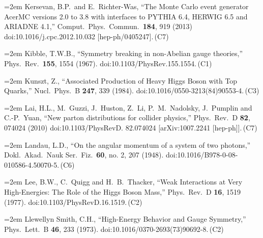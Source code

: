 \documentclass[letter,12pt]{article}
\def\xbibitem#1#2#3{\noindent\hangindent=2em #2\,(#3)}
\begin{document}
\xbibitem{Kersevan:2004yg}{Kersevan, B.P.\ and E.~Richter-Was,
  ``The Monte Carlo event generator AcerMC versions 2.0 to 3.8 with interfaces to PYTHIA 6.4, HERWIG 6.5 and ARIADNE 4.1,''
  Comput.\ Phys.\ Commun.\  {\bf 184}, 919 (2013)
  doi:10.1016/j.cpc.2012.10.032
  [hep-ph/0405247].}{C7}
  
\xbibitem{Kibble:1967sv} {Kibble, T.W.B.,
  ``Symmetry breaking in non-Abelian gauge theories,''
  Phys.\ Rev.\  {\bf 155}, 1554 (1967).
  doi:10.1103/PhysRev.155.1554.}{C1}

\xbibitem{Kunszt:1984ri}{Kunszt, Z.,
  ``Associated Production of Heavy Higgs Boson with Top Quarks,''
  Nucl.\ Phys.\ B {\bf 247}, 339 (1984).
  doi:10.1016/0550-3213(84)90553-4.}{C3}
  
\xbibitem{Lai:2010vv} {Lai, H.L., M.~Guzzi, J.~Huston, Z.~Li, P.~M.~Nadolsky, J.~Pumplin and C.-P.~Yuan,
  ``New parton distributions for collider physics,''
  Phys.\ Rev.\ D {\bf 82}, 074024 (2010)
  doi:10.1103/PhysRevD. 82.074024
  [arXiv:1007.2241 [hep-ph]].}{C7}
  
\xbibitem{Landau:1948kw}{Landau, L.D.,
``On the angular momentum of a system of two photons,'' 
Dokl.\ Akad.\ Nauk Ser.\ Fiz.\  {\bf 60}, no. 2, 207 (1948).
  doi:10.1016/B978-0-08-010586-4.50070-5.}{C6}

\xbibitem{Lee:1977eg}{Lee, B.W., C.~Quigg and H.~B.~Thacker,
  ``Weak Interactions at Very High-Energies: The Role of the Higgs Boson Mass,''
  Phys.\ Rev.\ D {\bf 16}, 1519 (1977).
  doi:10.1103/PhysRevD.16.1519.}{C2}

\xbibitem{LlewellynSmith:1973yud}{Llewellyn Smith, C.H.,
  ``High-Energy Behavior and Gauge Symmetry,''
  Phys.\ Lett.\ B {\bf 46}, 233 (1973).
  doi:10.1016/0370-2693(73)90692-8.}{C2}
    
\end{document}
